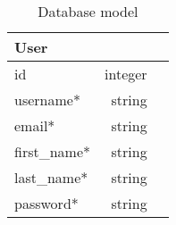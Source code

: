 \begin{table}[!htp]\centering
    \caption{Database model}\label{tab:dbModel}
    \scriptsize
    \begin{tabular}{lrr}\toprule
        User         &         \\\midrule
        id           & integer \\
        username*    & string  \\
        email*       & string  \\
        first\_name* & string  \\
        last\_name*  & string  \\
        password*    & string  \\
        \bottomrule
    \end{tabular}
\end{table}
